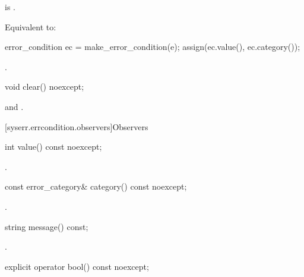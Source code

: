 \begin{itemdescr}
\pnum
\constraints
{} is .

\pnum
\effects
Equivalent to:
\begin{codeblock}
error_condition ec = make_error_condition(e);
assign(ec.value(), ec.category());
\end{codeblock}

\pnum
\returns
{}.
\end{itemdescr}

%
\begin{itemdecl}
void clear() noexcept;
\end{itemdecl}

\begin{itemdescr}
\pnum
\ensures
{} and .
\end{itemdescr}

[syserr.errcondition.observers]{Observers}

%
\begin{itemdecl}
int value() const noexcept;
\end{itemdecl}

\begin{itemdescr}
\pnum
\returns
{}.
\end{itemdescr}

%
\begin{itemdecl}
const error_category& category() const noexcept;
\end{itemdecl}

\begin{itemdescr}
\pnum
\returns
{}.
\end{itemdescr}

%
\begin{itemdecl}
string message() const;
\end{itemdecl}

\begin{itemdescr}
\pnum
\returns
{}.
\end{itemdescr}

%
\begin{itemdecl}
explicit operator bool() const noexcept;
\end{itemdecl}

